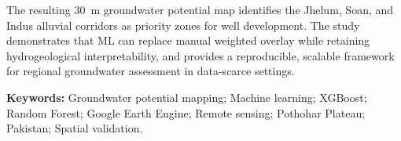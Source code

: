 The resulting 30~m groundwater potential map identifies the Jhelum, Soan, and
Indus alluvial corridors as priority zones for well development. The study
demonstrates that ML can replace manual weighted overlay while retaining
hydrogeological interpretability, and provides a reproducible, scalable
framework for regional groundwater assessment in data-scarce settings.

\vspace{0.4cm}
\noindent\textbf{Keywords:} Groundwater potential mapping; Machine learning;
XGBoost; Random Forest; Google Earth Engine; Remote sensing; Pothohar Plateau;
Pakistan; Spatial validation.

\cleardoublepage
